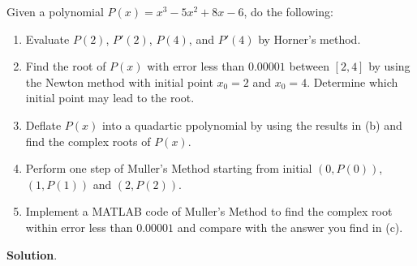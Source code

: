 \documentclass[11pt]{article}
\theoremstyle{break}
\numberwithin{equation}{theorem}
\begin{document}
\newpage
\begin{problem}\label{problem 11}
    Given a polynomial $P(x) = x^3-5x^2+8x-6$, do the following:
    \begin{enumerate}
        \item Evaluate $P(2)$, $P'(2)$, $P(4)$, and $P'(4)$ by Horner's method.
        \item Find the root of $P(x)$ with error less than $0.00001$ between $[2, 4]$ by using the Newton method with initial point $x_0 = 2$ and $x_0 = 4$. Determine which initial point may lead to the root.
        \item Deflate $P(x)$ into a quadartic ppolynomial by using the results in (b) and find the complex roots of $P(x)$.
        \item Perform one step of Muller's Method starting from initial $(0,P(0))$, $(1,P(1))$ and $(2,P(2))$.
        \item Implement a MATLAB code of Muller's Method to find the complex root within error less than $0.00001$ and compare with the answer you find in (c).
    \end{enumerate}
\end{problem}
\textbf{Solution}.
\end{document}
